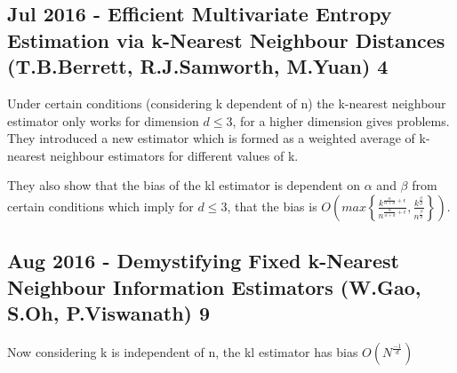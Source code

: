 \documentclass{article}
\begin{document}
\subsection{Jul 2016 - Efficient Multivariate Entropy Estimation via k-Nearest Neighbour Distances (T.B.Berrett, R.J.Samworth, M.Yuan) 4}

Under certain conditions (considering k dependent of n) the k-nearest neighbour estimator only works for dimension $d \leq 3$, for a higher dimension gives problems. They introduced a new estimator which is formed as a weighted average of k-nearest neighbour estimators for different values of k.

They also show that the bias of the kl estimator is dependent on $\alpha$ and $\beta$ from certain conditions which imply for $d \leq 3$,  that the bias is $O\left(max \left\{ \frac{k^{\frac{\alpha }{\alpha + d} + \epsilon}}{n^{\frac{\alpha}{\alpha + d} + \epsilon}}, \frac{k^{\frac{\beta}{d}}}{n^{\frac{\beta}{d}}} \right\} \right)$.

\subsection{Aug 2016 - Demystifying Fixed k-Nearest Neighbour Information Estimators (W.Gao, S.Oh, P.Viswanath) 9}

Now considering k is independent of n, the kl estimator has bias  $O(N^{\frac{-1}{d}})$
\end{document}

